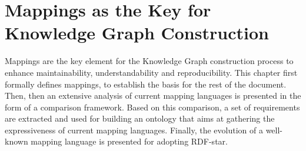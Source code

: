 
\chapter{Mappings as the Key for Knowledge Graph Construction}
\label{chapter:mappings}

Mappings are the key element for the Knowledge Graph construction process to enhance maintainability, understandability and reproducibility. This chapter first formally defines mappings, to establish the basis for the rest of the document. Then, then an extensive analysis of current mapping languages is presented in the form of a comparison framework. Based on this comparison, a set of requirements are extracted and used for building an ontology that aims at gathering the expressiveness of current mapping languages. Finally, the evolution of a well-known mapping language is presented for adopting RDF-star.








